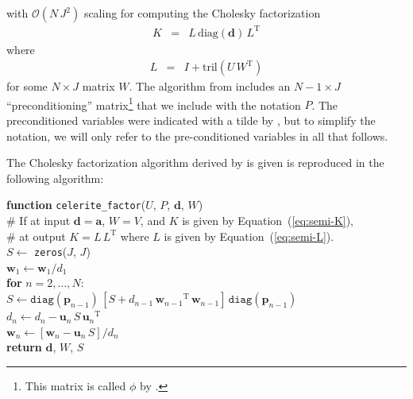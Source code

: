 \documentclass[rnaas]{aastex62}
\renewcommand{\eqref}[1]{\ref{eq:#1}}
\newcommand{\Eq}[1]{Equation~(\eqref{#1})}
\newcommand{\eqlabel}[1]{\label{eq:#1}}
\newcommand{\T}{\ensuremath{\mathrm{T}}}
\newcommand{\bvec}[1]{{\ensuremath{\boldsymbol{#1}}}}
\begin{document}
with $\mathcal{O}(N\,J^2)$ scaling for computing the Cholesky factorization
\begin{eqnarray}
K &=& L\,\mathrm{diag}(\bvec{d})\,L^\T
\end{eqnarray}
where
\begin{eqnarray}\eqlabel{semi-L}
L &=& I + \mathrm{tril}(U\,W^\T)
\end{eqnarray}
for some $N \times J$ matrix $W$.
The algorithm from \citet{Foreman-Mackey:2017} includes an $N-1 \times J$
``preconditioning'' matrix\footnote{This matrix is called $\phi$ by
\citet{Foreman-Mackey:2017}.} that we include with the notation $P$.
The preconditioned variables were indicated with a tilde by
\citet{Foreman-Mackey:2017}, but to simplify the notation, we will only refer
to the pre-conditioned variables in all that follows.

The Cholesky factorization algorithm derived by \citet{Foreman-Mackey:2017} is
given is reproduced in the following algorithm:

\medskip
\begin{minipage}{\linewidth}
\textbf{function} \texttt{celerite\_factor}($U$, $P$, $\bvec{d}$, $W$) \\
\hspace*{2em}\textsf{\# If at input $\bvec{d} = \bvec{a}$, $W = V$, and $K$ is
    given by \Eq{semi-K},} \\
\hspace*{2em}\textsf{\# at output $K = L\,L^\T$ where $L$ is given by
    \Eq{semi-L}.} \\
\hspace*{2em}$S \gets$ \texttt{zeros}($J$, $J$) \\
    \hspace*{2em}$\bvec{w}_1 \gets \bvec{w}_1 / d_{1}$ \\
\hspace*{2em}\textbf{for} $n = 2,\ldots,N$:\\
\hspace*{2em}\hspace*{2em}$S \gets \texttt{diag}(\bvec{p}_{n-1})\,[
    S + d_{n-1}\,{\bvec{w}_{n-1}}^\T\,{\bvec{w}_{n-1}}
]\,\texttt{diag}(\bvec{p}_{n-1})$ \\
\hspace*{2em}\hspace*{2em}$d_{n} \gets d_{n} - \bvec{u}_n\,S\,{\bvec{u}_n}^\T$\\
\hspace*{2em}\hspace*{2em}$\bvec{w}_n \gets \left[\bvec{w}_n -
    \bvec{u}_n\,S \right] / d_{n}$\\
    \hspace*{2em}\textbf{return} $\bvec{d}$, $W$, $S$
\end{minipage}
\medskip
\end{document}
